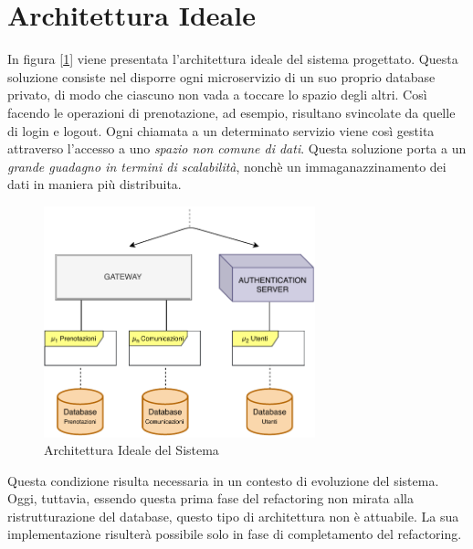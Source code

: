 \section{Architettura Ideale}
In figura [\ref{fig:idealarchitecture}] viene presentata l'architettura ideale del sistema progettato. Questa soluzione consiste nel disporre ogni microservizio di un suo proprio database privato, di modo che ciascuno non vada a toccare lo spazio degli altri. Così facendo le operazioni di prenotazione, ad esempio, risultano svincolate da quelle di login e logout. Ogni chiamata a un determinato servizio viene così gestita attraverso l'accesso a uno \emph{spazio non comune di dati}. Questa soluzione porta a un \textit{grande guadagno in termini di scalabilità}, nonchè un immaganazzinamento dei dati in maniera più distribuita. 
\begin{figure}[H]
    \centering
    \includegraphics[width=0.70\textwidth]{images/02_7_ideal_architecture.pdf}
    \caption{Architettura Ideale del Sistema}
    \label{fig:idealarchitecture}
\end{figure}
Questa condizione risulta necessaria in un contesto di evoluzione del sistema. Oggi, tuttavia, essendo questa prima fase del refactoring non mirata alla ristrutturazione del database, questo tipo di architettura non è attuabile. La sua implementazione risulterà possibile solo in fase di completamento del refactoring.